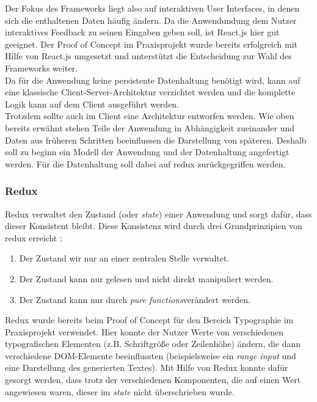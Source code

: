 Der Fokus des Frameworks liegt also auf interaktiven User Interfaces, in denen sich die enthaltenen Daten häufig ändern. Da die Anwendundung dem Nutzer interaktives Feedback zu seinen Eingaben geben soll, ist React.js hier gut geeignet. Der Proof of Concept im Praxisprojekt wurde bereits erfolgreich mit Hilfe von React.js umgesetzt und unterstützt die Entscheidung zur Wahl des Frameworks weiter. \\

Da für die Anwendung keine persistente Datenhaltung benötigt wird, kann auf eine klassische Client-Server-Architektur verzichtet werden und die komplette Logik kann auf dem Client ausgeführt werden.\\
Trotzdem sollte auch im Client eine Architektur entworfen werden. Wie oben bereits erwähnt stehen Teile der Anwendung in Abhängigkeit zueinander und Daten aus früheren Schritten beeinflussen die Darstellung von späteren\footnotemark[1]. Deshalb soll zu beginn ein Modell der Anwendung und der Datenhaltung angefertigt werden. Für die Datenhaltung soll dabei auf redux zurückgegriffen werden.

\subsubsection{Redux}
Redux verwaltet den Zustand (oder \textit{state}) einer Anwendung und sorgt dafür, dass dieser Konsistent bleibt. Diese Konsistenz wird durch drei Grundprinzipien von redux erreicht \cite{threeprinciplesredux}:

\begin{enumerate}
  \item Der Zustand wir nur an einer zentralen Stelle verwaltet.
  \item Der Zustand kann nur gelesen und nicht direkt manipuliert werden.
  \item Der Zustand kann nur durch \textit{pure functions}\footnotemark[2] verändert werden.
\end{enumerate}

Redux wurde bereits beim Proof of Concept für den Bereich Typographie im Praxisprojekt verwendet. Hier konnte der Nutzer Werte von verschiedenen typografischen Elementen (z.B. Schriftgröße oder Zeilenhöhe) ändern, die dann verschiedene DOM-Elemente beeinflussten (beispielsweise ein \textit{range input} und eine Darstellung des generierten Textes). Mit Hilfe von Redux konnte dafür gesorgt werden, dass trotz der verschiedenen Komponenten, die auf einen Wert angewiesen waren, dieser im \textit{state} nicht überschrieben wurde.

